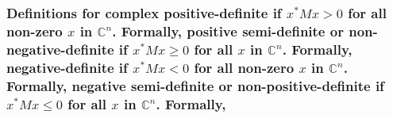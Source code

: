{{{{{{\subsubsection{Definitions for complex
%
%
\textbf{positive-definite} if \(x^* Mx > 0\) for all non-zero \(x\) in
\(\mathbb{C}^n\). Formally,
%
\textbf{positive semi-definite} or \textbf{non-negative-definite} if
\(x^* Mx \geq 0\) for all \(x\) in \(\mathbb{C}^n\). Formally,
%
\textbf{negative-definite} if \(x^* Mx < 0\) for all non-zero \(x\) in
\(\mathbb{C}^n\). Formally,
%
\textbf{negative semi-definite} or \textbf{non-positive-definite} if
\(x^* Mx \leq 0\) for all \(x\) in \(\mathbb{C}^n\). Formally,
%
%
\hypertarget{consistency-between-real-and-complex-definitions}{%
}}}}}}}}
